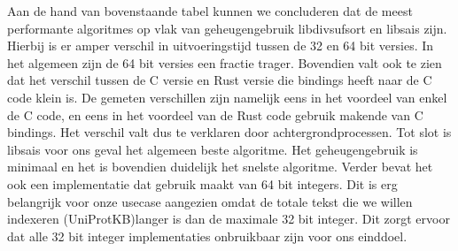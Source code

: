 \begin{table}[H]
    \centering
    \caption{}
    \label{tab:sa_building}
\end{table}

Aan de hand van bovenstaande tabel kunnen we concluderen dat de meest performante algoritmes op vlak van geheugengebruik libdivsufsort en libsais zijn.
Hierbij is er amper verschil in uitvoeringstijd tussen de 32 en 64 bit versies.
In het algemeen zijn de 64 bit versies een fractie trager.
Bovendien valt ook te zien dat het verschil tussen de C versie en Rust versie die bindings heeft naar de C code klein is.
De gemeten verschillen zijn namelijk eens in het voordeel van enkel de C code, en eens in het voordeel van de Rust code gebruik makende van C bindings.
Het verschil valt dus te verklaren door achtergrondprocessen.
Tot slot is libsais voor ons geval het algemeen beste algoritme.
Het geheugengebruik is minimaal en het is bovendien duidelijk het snelste algoritme.
Verder bevat het ook een implementatie dat gebruik maakt van 64 bit integers.
Dit is erg belangrijk voor onze usecase aangezien omdat de totale tekst die we willen indexeren (UniProtKB)langer is dan de maximale 32 bit integer.
Dit zorgt ervoor dat alle 32 bit integer implementaties onbruikbaar zijn voor ons einddoel.

